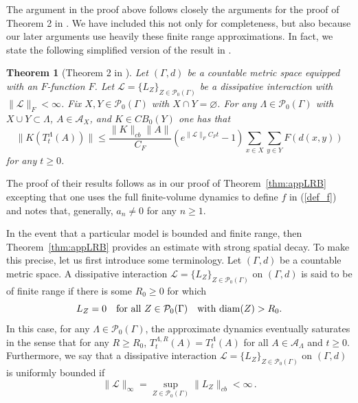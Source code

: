 \documentclass{article}
\newcommand{\<}{\langle}
\renewcommand{\>}{\rangle}
\let\emptyset\varnothing
\numberwithin{equation}{section}
\newtheorem{thm}{Theorem}[section]
\theoremstyle{definition}
\begin{document}
%
%

The argument in the proof above follows closely the arguments for the proof of Theorem 2 in \cite{NachtergaeleVershyninaZagrebnov}. 
We have included this not only for completeness, but also because our later arguments use heavily 
these finite range approximations. In fact, we state the following simplified version of the result in \cite{NachtergaeleVershyninaZagrebnov}.

\begin{thm}[Theorem 2 in \cite{NachtergaeleVershyninaZagrebnov}] \label{thm:NVZ_LRB}
Let $(\Gamma, d)$ be a countable metric space equipped with an $F$-function $F$.
Let $\mathscr{L} = \{L_Z \}_{Z \in \mathcal{P}_0(\Gamma)}$ be a dissipative interaction with $\| \mathscr{L} \|_F< \infty$. 
Fix $X,Y \in \mathcal{P}_0(\Gamma)$ with $X \cap Y = \emptyset$. 
For any $\Lambda \in \mathcal{P}_0( \Gamma)$ with $X \cup Y \subset \Lambda$, $A \in \mathcal{A}_X$, and 
$K\in CB_0(Y)$ one has that 
    \begin{equation}\label{NVZ_LRB}
        \|K(T^{\Lambda}_t(A))\| \le \frac{\|K\|_{cb}\|A\|}{C_F} \left(e^{ \| \mathscr{L} \|_F C_F t} -1 \right) \sum_{x\in X}\sum_{y\in Y} F(d(x,y))
    \end{equation}
    for any $t \geq 0$.
\end{thm}

The proof of their results follows as in our proof of Theorem~\ref{thm:appLRB} excepting that one uses the full finite-volume
dynamics to define $f$ in (\ref{def_f}) and notes that, generally, $a_n \neq 0$ for any $n \geq 1$. 

In the event that a particular model is bounded and finite range, then Theorem~\ref{thm:appLRB} provides an estimate with strong spatial decay.
To make this precise, let us first introduce some terminology. Let $(\Gamma, d)$ be a countable metric space.
A dissipative interaction $\mathscr{L}= \{ L_Z \}_{Z \in \mathcal{P}_0(\Gamma)}$ on $(\Gamma, d)$ 
is said to be of finite range if there is some $R_0 \geq 0$ for which
\begin{equation} \label{finite_range}
L_Z = 0 \quad \mbox{for all } Z \in \mathcal{P}_0(\Gamma) \quad \mbox{with } {\rm diam}(Z) > R_0.
\end{equation} 
In this case, for any $\Lambda \in \mathcal{P}_0(\Gamma)$, the approximate dynamics eventually saturates in the sense that for any 
$R \geq R_0$, $T_t^{\Lambda,R}(A) = T_t^{\Lambda}(A)$ for all $A \in \mathcal{A}_{\Lambda}$ and $t \geq 0$.  
Furthermore, we say that a dissipative interaction $\mathscr{L}= \{ L_Z \}_{Z \in \mathcal{P}_0(\Gamma)}$ on 
$(\Gamma, d)$ is uniformly bounded if 
\begin{equation} \label{uni_bd}
\| \mathscr{L} \|_{\infty} = \sup_{Z \in \mathcal{P}_0(\Gamma)} \| L_Z \|_{cb} < \infty \, .
\end{equation}
\end{document}
